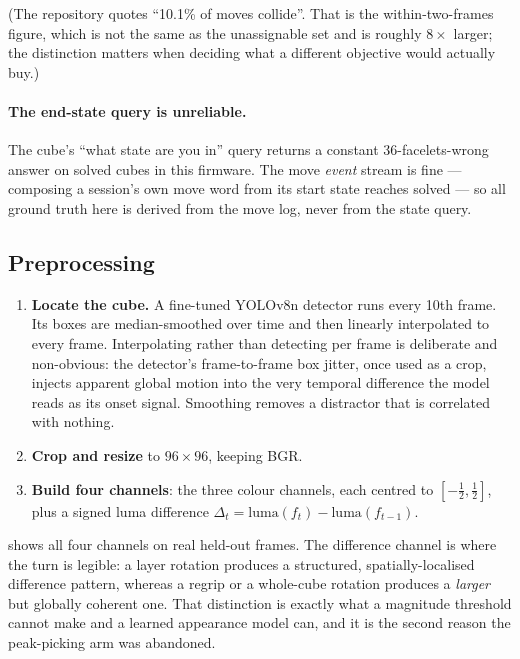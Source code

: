 (The repository quotes ``10.1\% of moves collide''. That is the
within-two-frames figure, which is not the same as the unassignable set and
is roughly $8\times$ larger; the distinction matters when deciding what a
different objective would actually buy.)

\paragraph{The end-state query is unreliable.} The cube's ``what state are
you in'' query returns a constant 36-facelets-wrong answer on solved cubes
in this firmware. The move \emph{event} stream is fine --- composing a
session's own move word from its start state reaches solved --- so all
ground truth here is derived from the move log, never from the state query.

\subsection{Preprocessing}
\label{sec:preproc}

\begin{enumerate}[leftmargin=1.4em,itemsep=3pt]
\item \textbf{Locate the cube.} A fine-tuned YOLOv8n detector runs every
10th frame. Its boxes are median-smoothed over time and then linearly
interpolated to every frame. Interpolating rather than detecting per frame
is deliberate and non-obvious: the detector's frame-to-frame box jitter,
once used as a crop, injects apparent global motion into the very temporal
difference the model reads as its onset signal. Smoothing removes a
distractor that is correlated with nothing.
\item \textbf{Crop and resize} to $96\times96$, keeping BGR.
\item \textbf{Build four channels}: the three colour channels, each centred
to $[-\tfrac12,\tfrac12]$, plus a signed luma difference
$\Delta_t = \mathrm{luma}(f_t) - \mathrm{luma}(f_{t-1})$.
\end{enumerate}

 shows all four channels on real held-out frames. The
difference channel is where the turn is legible: a layer rotation produces a
structured, spatially-localised difference pattern, whereas a regrip or a
whole-cube rotation produces a \emph{larger} but globally coherent one. That
distinction is exactly what a magnitude threshold cannot make and a learned
appearance model can, and it is the second reason the peak-picking arm was
abandoned.

